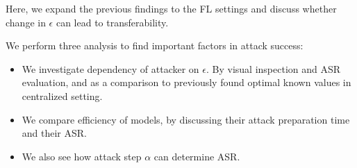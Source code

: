  Here, we expand the previous findings to the FL settings and discuss whether change in $\epsilon$ can lead to transferability. 
  
We perform three analysis to find important factors in attack success:
\begin{itemize}
    \item We investigate dependency of attacker on $\epsilon$. By visual inspection and ASR evaluation, and as a comparison to previously found optimal known values in centralized  setting.
    \item  We compare  efficiency of models, by discussing their attack preparation time and their ASR.
    \item We also see how attack step $\alpha$ can determine ASR.
\end{itemize}

